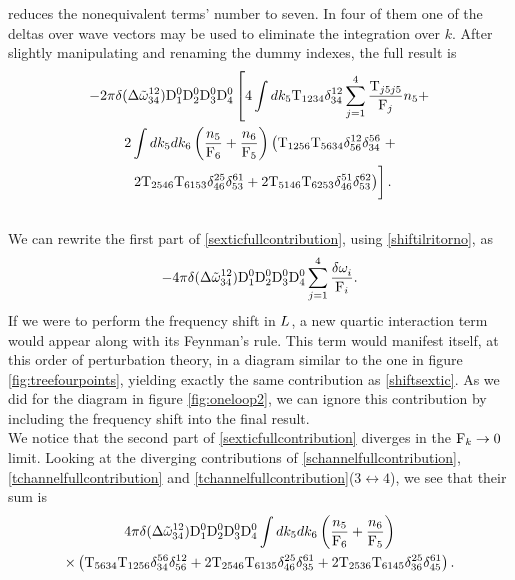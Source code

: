 reduces the nonequivalent terms' number to seven. In four of them one of the deltas over wave vectors may be used to eliminate the integration over $k$. After slightly manipulating
and renaming the dummy indexes, the full result is 
\begin{multline}
    -2\pi \delta(\delomegatt^{12}_{34})\D_1^0\D_2^0\D_3^0\D_4^0\left[ 4\int dk_5 \Tint_{1234}\delta^{12}_{34} \sum_{j=1}^{4}\frac{\Tint_{j5j5}}{\F_j}n_5 + \right.\\ 
      2\int dk_5 dk_6\left( \frac{n_5}{\F_6} + \frac{n_6}{\F_5} \right)\left( \Tint_{1256}\Tint_{5634}\delta^{12}_{56}\delta^{56}_{34} \right. +
    \\\left. \vphantom{\frac{\Tint_{j5j5}}{\F_j}} \left. 
     2\Tint_{2546}\Tint_{6153}\delta^{25}_{46}\delta^{61}_{53}
    + 2\Tint_{5146}\Tint_{6253}\delta^{51}_{46}\delta^{62}_{53} \right) \right].
    \label{sexticfullcontribution}
\end{multline}
\\
We can rewrite the first part of \eqref{sexticfullcontribution}, using \eqref{shiftilritorno}, as 
\begin{equation}
    -4\pi \delta(\Delta{\tilde{\omega}}^{12}_{34})\mathrm{D}_1^0\mathrm{D}_2^0\mathrm{D}_3^0\mathrm{D}_4^0\sum_{j=1}^{4}\frac{\delta \omega^{}_i}{\mathrm{F}_i}.
    \label{shiftsextic}
\end{equation}
If we were to perform the frequency shift in $L$, a new quartic interaction term would appear along with its Feynman's rule. 
This term would manifest itself, at this order of perturbation theory, in a diagram similar to the one in figure \ref{fig:treefourpoints}, 
yielding exactly the same contribution as \eqref{shiftsextic}. As we did for the diagram in figure \ref{fig:oneloop2}, we can ignore this contribution by including
the frequency shift into the final result. \\
We notice that the second part of \eqref{sexticfullcontribution} diverges in the $\mathrm{F}_k \rightarrow 0$ limit. Looking at the diverging contributions of 
\eqref{schannelfullcontribution}, \eqref{tchannelfullcontribution} and \eqref{tchannelfullcontribution}($3 \leftrightarrow 4$), we see that their sum is
\begin{multline}
    4\pi\delta(\Delta{\tilde{\omega}}^{12}_{34})\mathrm{D}_1^0\mathrm{D}_2^0\mathrm{D}_3^0\mathrm{D}_4^0\int dk_5 dk_6
     \left( \frac{n_5}{\mathrm{F}_6} + \frac{n_6}{\mathrm{F}_5}\right)\\ \times\left(
    \mathrm{T}_{5634}\mathrm{T}_{1256}\delta^{56}_{34}\delta^{12}_{56} + 2 \mathrm{T}_{2546}\mathrm{T}_{6135}\delta^{25}_{46}\delta^{61}_{35} + 2\mathrm{T}_{2536}\mathrm{T}_{6145}\delta^{25}_{36}\delta^{61}_{45}
    \right).
\end{multline}
